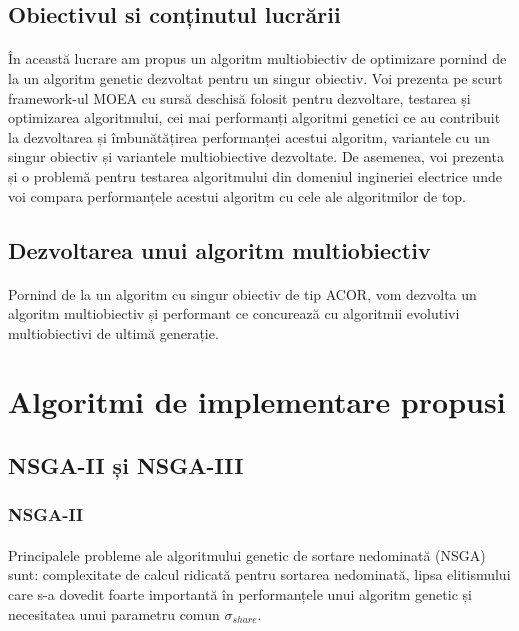 \documentclass[12pt]{article}
\begin{document}
\subsection{Obiectivul si conținutul lucrării}
\paragraph{}
În această lucrare am propus un algoritm multiobiectiv de optimizare pornind de la un algoritm genetic dezvoltat pentru un singur obiectiv. Voi prezenta pe scurt framework-ul MOEA cu sursă deschisă folosit pentru dezvoltare, testarea și optimizarea algoritmului, cei mai performanți algoritmi genetici ce au contribuit la dezvoltarea și îmbunătățirea performanței acestui algoritm, variantele cu un singur obiectiv și variantele multiobiective dezvoltate. De asemenea, voi prezenta și o problemă pentru testarea algoritmului din domeniul ingineriei electrice unde voi compara performanțele acestui algoritm cu cele ale algoritmilor de top.
\subsection{Dezvoltarea unui algoritm multiobiectiv}
\paragraph{}
Pornind de la un algoritm cu singur obiectiv de tip ACOR, vom dezvolta un algoritm multiobiectiv și performant ce concurează cu algoritmii evolutivi multiobiectivi de ultimă generație.
\section{Algoritmi de implementare propusi}
\subsection{NSGA-II și NSGA-III}
\subsubsection{NSGA-II}
\paragraph{}
Principalele probleme ale algoritmului genetic de sortare nedominată (NSGA) sunt: complexitate de calcul ridicată pentru sortarea nedominată, lipsa elitismului care s-a dovedit foarte importantă în performanțele unui algoritm genetic și necesitatea unui parametru comun $\sigma_{share}$. \cite{nsgaii}
\end{document}
